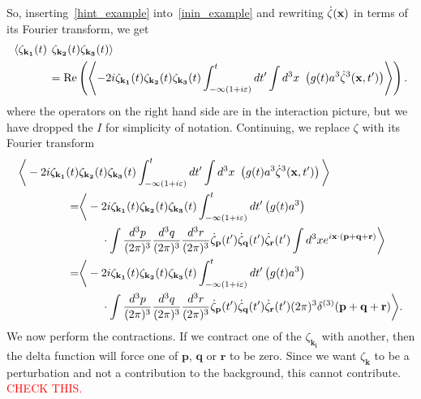 So, inserting~\eqref{hint_example} into~\eqref{inin_example}
and rewriting $\dot{\zeta}(\mathbf{x})$ in terms of its Fourier transform,
we get
\begin{align}\label{inin_example_start}
    \left<\zeta_{\mathbf{k_1}}(t)\right.&\left.\zeta_{\mathbf{k_2}}(t)\zeta_{\mathbf{k_3}}(t)\right>\\
    &=\operatorname{Re}\left(\left<-2i \zeta_{\mathbf{k_1}}(t)\zeta_{\mathbf{k_2}}(t)\zeta_{\mathbf{k_3}}(t)
    \int_{-\infty(1+i\varepsilon)}^{t}dt'
    \int d^3x~\left(g(t) a^3\dot{\zeta}^3(\mathbf{x},t')\right)
    \right>\right).
\end{align}
where the operators on the right hand side are in the interaction picture,
but we have dropped the $I$ for simplicity of notation.
Continuing, we replace $\zeta$ with its Fourier transform
\begin{align}\label{inin_example_2}
    \bigg<-2i \zeta_{\mathbf{k_1}}(t)&\zeta_{\mathbf{k_2}}(t)\zeta_{\mathbf{k_3}}(t)
    \int_{-\infty(1+i\varepsilon)}^{t}dt'
    \int d^3x~\left(g(t) a^3\dot{\zeta}^3(\mathbf{x},t')\right)
    \bigg>\\
    =&\bigg<-2i \zeta_{\mathbf{k_1}}(t)\zeta_{\mathbf{k_2}}(t)\zeta_{\mathbf{k_3}}(t)
    \int_{-\infty(1+i\varepsilon)}^{t}dt'\left(g(t) a^3\right)\nonumber\\
    &\qquad\cdot
    \int \frac{d^3p}{(2\pi)^3}
    \frac{d^3q}{(2\pi)^3}
    \frac{d^3r}{(2\pi)^3}
    \dot{\zeta}_{\mathbf{p}}(t')
    \dot{\zeta}_{\mathbf{q}}(t')
    \dot{\zeta}_{\mathbf{r}}(t')
    \int d^3x e^{i\mathbf{x}\cdot(\mathbf{p}+\mathbf{q}+\mathbf{r})}
    \bigg>\\
    =&\bigg<-2i \zeta_{\mathbf{k_1}}(t)\zeta_{\mathbf{k_2}}(t)\zeta_{\mathbf{k_3}}(t)
    \int_{-\infty(1+i\varepsilon)}^{t}dt'\left(g(t) a^3\right)\nonumber\\
    &\qquad\cdot
    \int \frac{d^3p}{(2\pi)^3}
    \frac{d^3q}{(2\pi)^3}
    \frac{d^3r}{(2\pi)^3}
    \dot{\zeta}_{\mathbf{p}}(t')
    \dot{\zeta}_{\mathbf{q}}(t')
    \dot{\zeta}_{\mathbf{r}}(t')
    (2\pi)^3\delta^{(3)}(\mathbf{p}+\mathbf{q}+\mathbf{r})
    \bigg>.
\end{align}
We now perform the contractions. If we contract one of the $\zeta_{\mathbf{k_i}}$ with
another, then the delta function will force one of $\mathbf{p}$, $\mathbf{q}$
or $\mathbf{r}$ to be zero. Since we want $\zeta_\mathbf{k}$ to be a perturbation
and not a contribution to the background, this cannot contribute.
\textcolor{red}{CHECK THIS.}

